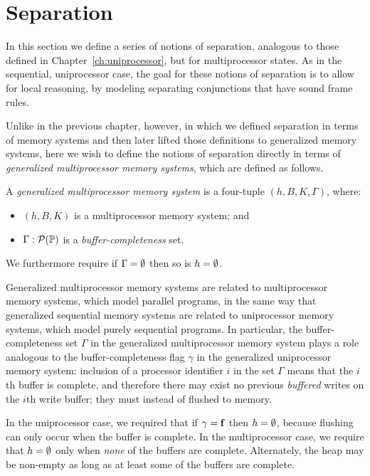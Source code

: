 \documentclass[11pt]{report}
\begin{document}
\section{Separation}

In this section we define a series of notions of separation, analogous to those defined in Chapter~\ref{ch:uniprocessor}, but for multiprocessor states. As in the sequential, uniprocessor case, the goal for these notions of separation is to allow for local reasoning, by modeling separating conjunctions that have sound frame rules. 

Unlike in the previous chapter, however, in which we defined separation in terms of memory systems and then later lifted those definitions to generalized memory systems, here we wish to define the notions of separation directly in terms of \emph{generalized multiprocessor memory systems}, which are defined as follows. 

\begin{definition}
  A \emph{generalized multiprocessor memory system} is a four-tuple $(h,B,K,\Gamma)$, where: 
  \begin{itemize}
    \item $(h,B,K)$ is a multiprocessor memory system; and 
    \item $\Gamma : \mathcal{P}(\mathbb{P})$ is a \emph{buffer-completeness} set. 
  \end{itemize} We furthermore require if $\Gamma = \operatorname{\emptyset}$ then so is $h = \operatorname{\emptyset}$. 
\end{definition}

Generalized multiprocessor memory systems are related to multiprocessor memory systems, which model parallel programs, in the same way that generalized sequential memory systems are related to uniprocessor memory systems, which model purely sequential programs. In particular, the buffer-completeness set $\Gamma$ in the generalized multiprocessor memory system plays a role analogous to the buffer-completeness flag $\gamma$ in the generalized uniprocessor memory system: inclusion of a processor identifier $i$ in the set $\Gamma$ means that the $i$th buffer is complete, and therefore there may exist no previous \emph{buffered} writes on the $i$th write buffer; they must instead of flushed to memory. 

In the uniprocessor case, we required that if $\gamma = \mathbf{f}$ then $h = \operatorname{\emptyset}$, because flushing can only occur when the buffer is complete. In the multiprocessor case, we require that $h = \operatorname{\emptyset}$ only when \emph{none} of the buffers are complete. Alternately, the heap may be non-empty as long as at least some of the buffers are complete. 
\end{document}
